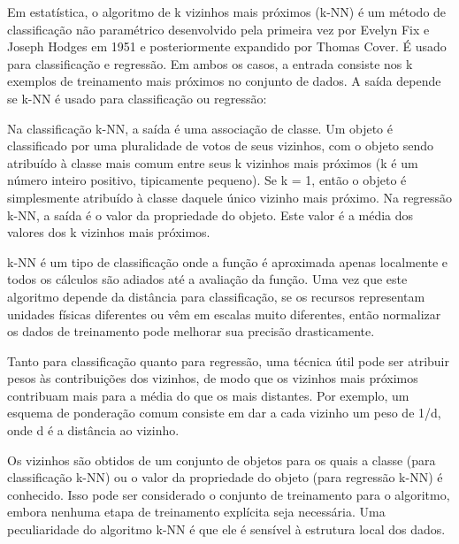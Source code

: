 \documentclass{article}
\begin{document}
Em estatística, o algoritmo de k vizinhos mais próximos (k-NN) é um método de classificação não paramétrico desenvolvido pela primeira vez por Evelyn Fix e Joseph Hodges em 1951 e posteriormente expandido por Thomas Cover. É usado para classificação e regressão. Em ambos os casos, a entrada consiste nos k exemplos de treinamento mais próximos no conjunto de dados. A saída depende se k-NN é usado para classificação ou regressão:

Na classificação k-NN, a saída é uma associação de classe. Um objeto é classificado por uma pluralidade de votos de seus vizinhos, com o objeto sendo atribuído à classe mais comum entre seus k vizinhos mais próximos (k é um número inteiro positivo, tipicamente pequeno). Se k = 1, então o objeto é simplesmente atribuído à classe daquele único vizinho mais próximo. Na regressão k-NN, a saída é o valor da propriedade do objeto. Este valor é a média dos valores dos k vizinhos mais próximos.

k-NN é um tipo de classificação onde a função é aproximada apenas localmente e todos os cálculos são adiados até a avaliação da função. Uma vez que este algoritmo depende da distância para classificação, se os recursos representam unidades físicas diferentes ou vêm em escalas muito diferentes, então normalizar os dados de treinamento pode melhorar sua precisão drasticamente.

Tanto para classificação quanto para regressão, uma técnica útil pode ser atribuir pesos às contribuições dos vizinhos, de modo que os vizinhos mais próximos contribuam mais para a média do que os mais distantes. Por exemplo, um esquema de ponderação comum consiste em dar a cada vizinho um peso de 1/d, onde d é a distância ao vizinho.

Os vizinhos são obtidos de um conjunto de objetos para os quais a classe (para classificação k-NN) ou o valor da propriedade do objeto (para regressão k-NN) é conhecido. Isso pode ser considerado o conjunto de treinamento para o algoritmo, embora nenhuma etapa de treinamento explícita seja necessária. Uma peculiaridade do algoritmo k-NN é que ele é sensível à estrutura local dos dados.

\end{document}
